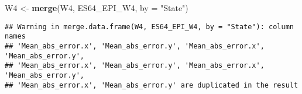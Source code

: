 \documentclass[
]{article}
\newenvironment{Shaded}{\begin{snugshade}}{\end{snugshade}}
\newcommand{\AttributeTok}[1]{\textcolor[rgb]{0.13,0.29,0.53}{#1}}
\newcommand{\FunctionTok}[1]{\textcolor[rgb]{0.13,0.29,0.53}{\textbf{#1}}}
\newcommand{\NormalTok}[1]{#1}
\newcommand{\OtherTok}[1]{\textcolor[rgb]{0.56,0.35,0.01}{#1}}
\newcommand{\StringTok}[1]{\textcolor[rgb]{0.31,0.60,0.02}{#1}}
\begin{document}
\begin{Shaded}
\begin{Highlighting}[]
\NormalTok{W4 }\OtherTok{\textless{}{-}} \FunctionTok{merge}\NormalTok{(W4, ES64\_EPI\_W4, }\AttributeTok{by =} \StringTok{"State"}\NormalTok{)}
\end{Highlighting}
\end{Shaded}

\begin{verbatim}
## Warning in merge.data.frame(W4, ES64_EPI_W4, by = "State"): column names
## 'Mean_abs_error.x', 'Mean_abs_error.y', 'Mean_abs_error.x', 'Mean_abs_error.y',
## 'Mean_abs_error.x', 'Mean_abs_error.y', 'Mean_abs_error.x', 'Mean_abs_error.y',
## 'Mean_abs_error.x', 'Mean_abs_error.y' are duplicated in the result
\end{verbatim}
\end{document}
